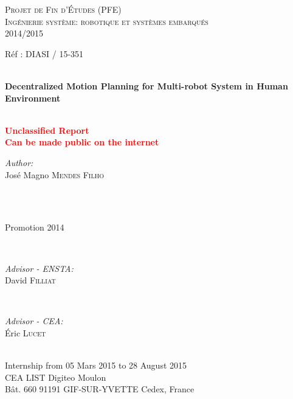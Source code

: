 \documentclass[12pt]{book}
\numberwithin{equation}{section}
\begin{document}
\begin{titlepage}

\textsc{\LARGE Projet de Fin d'Études (PFE)}\\[0.2cm]
\textsc{\Large Ingénierie système: robotique et systèmes embarqués}\\[0.3cm]
\Large{2014/2015}\\[0.4cm]


{Réf : DIASI / 15-351 \hfill}

\HRule \\[0.2cm]
\Huge \textbf{Decentralized Motion Planning for Multi-robot System in Human Environment}\\[-0.2cm] %
\HRule \\[0.5cm]
\begin{center}
\textbf{\textcolor{red}{\Large{
Unclassified Report}\\[-0.4cm]%
\large{Can be made public on the internet}
}}
\end{center}

\begin{minipage}{0.55\textwidth}
\begin{flushleft} \Large
\emph{Author:}\\
José Magno \textsc{Mendes Filho} \\[0.7cm] %
\end{flushleft}
\end{minipage}
~
\begin{minipage}{0.35\textwidth}
\begin{flushright} \Large
\mbox{}\\[0.4cm]
Promotion 2014
\end{flushright}
\end{minipage}\\[1.0cm]

\begin{minipage}{0.45\textwidth}
\begin{flushleft} \large
\emph{Advisor - ENSTA:}\\
David \textsc{Filliat} %
\end{flushleft}
\end{minipage}
~
\begin{minipage}{0.45\textwidth}
\begin{flushright} \large
\emph{Advisor - CEA:} \\
Éric \textsc{Lucet} %
\end{flushright}
\end{minipage}\\[1.0cm]

\large{Internship from 05 Mars 2015 to 28 August 2015}\\[0.6cm]
\large{CEA LIST Digiteo Moulon\\ Bât. 660 91191 GIF-SUR-YVETTE Cedex, France}

\end{titlepage}
\thispagestyle{empty}
\end{document}
